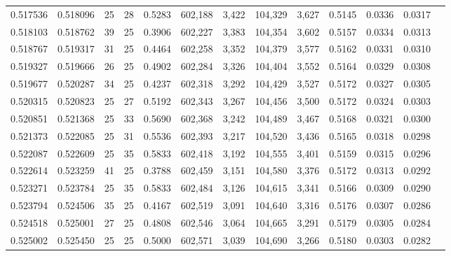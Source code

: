 \begin{tabular}{rrrrrrrrrrrrr}
0.517536 & 0.518096 &    25 &  28 &                                     0.5283 & 602,188 &   3,422 & 104,329 &   3,627 & 0.5145 & 0.0336 & 0.0317 \\
0.518103 & 0.518762 &    39 &  25 &                                     0.3906 & 602,227 &   3,383 & 104,354 &   3,602 & 0.5157 & 0.0334 & 0.0313 \\
0.518767 & 0.519317 &    31 &  25 &                                     0.4464 & 602,258 &   3,352 & 104,379 &   3,577 & 0.5162 & 0.0331 & 0.0310 \\
0.519327 & 0.519666 &    26 &  25 &                                     0.4902 & 602,284 &   3,326 & 104,404 &   3,552 & 0.5164 & 0.0329 & 0.0308 \\
0.519677 & 0.520287 &    34 &  25 &                                     0.4237 & 602,318 &   3,292 & 104,429 &   3,527 & 0.5172 & 0.0327 & 0.0305 \\
0.520315 & 0.520823 &    25 &  27 &                                     0.5192 & 602,343 &   3,267 & 104,456 &   3,500 & 0.5172 & 0.0324 & 0.0303 \\
0.520851 & 0.521368 &    25 &  33 &                                     0.5690 & 602,368 &   3,242 & 104,489 &   3,467 & 0.5168 & 0.0321 & 0.0300 \\
0.521373 & 0.522085 &    25 &  31 &                                     0.5536 & 602,393 &   3,217 & 104,520 &   3,436 & 0.5165 & 0.0318 & 0.0298 \\
0.522087 & 0.522609 &    25 &  35 &                                     0.5833 & 602,418 &   3,192 & 104,555 &   3,401 & 0.5159 & 0.0315 & 0.0296 \\
0.522614 & 0.523259 &    41 &  25 &                                     0.3788 & 602,459 &   3,151 & 104,580 &   3,376 & 0.5172 & 0.0313 & 0.0292 \\
0.523271 & 0.523784 &    25 &  35 &                                     0.5833 & 602,484 &   3,126 & 104,615 &   3,341 & 0.5166 & 0.0309 & 0.0290 \\
0.523794 & 0.524506 &    35 &  25 &                                     0.4167 & 602,519 &   3,091 & 104,640 &   3,316 & 0.5176 & 0.0307 & 0.0286 \\
0.524518 & 0.525001 &    27 &  25 &                                     0.4808 & 602,546 &   3,064 & 104,665 &   3,291 & 0.5179 & 0.0305 & 0.0284 \\
0.525002 & 0.525450 &    25 &  25 &                                     0.5000 & 602,571 &   3,039 & 104,690 &   3,266 & 0.5180 & 0.0303 & 0.0282 \\

\end{tabular}
